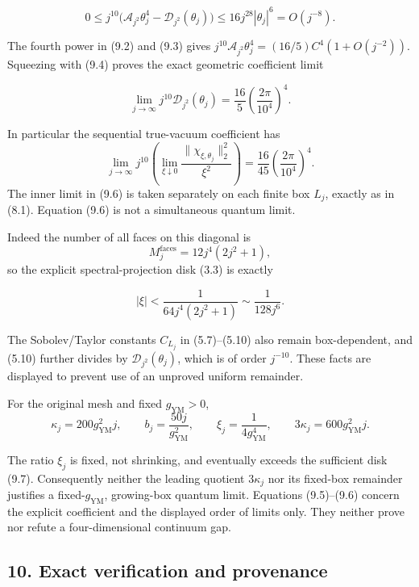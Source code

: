 \documentclass[
  11pt,
]{article}
\begin{document}
\[
0\le j^{10}\big(\mathcal A_{j^2}\theta_j^4
-\mathcal D_{j^2}(\theta_j)\big)
\le16j^{28}|\theta_j|^6=O(j^{-8}).
\tag{9.4}
\]

The fourth power in (9.2) and (9.3) gives
\(j^{10}\mathcal A_{j^2}\theta_j^4
=(16/5)C^4(1+O(j^{-2}))\). Squeezing with (9.4) proves the exact
geometric coefficient limit

\[
\boxed{\lim_{j\to\infty}j^{10}\mathcal D_{j^2}(\theta_j)
=\frac{16}{5}\left(\frac{2\pi}{10^4}\right)^4.}
\tag{9.5}
\]

In particular the sequential true-vacuum coefficient has \[
\lim_{j\to\infty}j^{10}
\left(\lim_{\xi\downarrow0}
\frac{\|\chi_{\xi,\theta_j}\|_2^2}{\xi^2}\right)
=\frac{16}{45}\left(\frac{2\pi}{10^4}\right)^4.
\tag{9.6}
\] The inner limit in (9.6) is taken separately on each finite box
\(L_j\), exactly as in (8.1). Equation (9.6) is not a simultaneous
quantum limit.

Indeed the number of all faces on this diagonal is \[
M_j^{\mathrm{faces}}=12j^4(2j^2+1),
\] so the explicit spectral-projection disk (3.3) is exactly

\[
|\xi|<\frac1{64j^4(2j^2+1)}
\sim\frac1{128j^6}.
\tag{9.7}
\]

The Sobolev/Taylor constants \(C_{L_j}\) in (5.7)--(5.10) also remain
box-dependent, and (5.10) further divides by
\(\mathcal D_{j^2}(\theta_j)\), which is of order \(j^{-10}\). These
facts are displayed to prevent use of an unproved uniform remainder.

For the original mesh and fixed \(g_{\mathrm{YM}}>0\), \[
\kappa_j=200g_{\mathrm{YM}}^2j,\qquad
b_j=\frac{50j}{g_{\mathrm{YM}}^2},\qquad
\xi_j=\frac1{4g_{\mathrm{YM}}^4},\qquad
3\kappa_j=600g_{\mathrm{YM}}^2j.
\tag{9.8}
\]

The ratio \(\xi_j\) is fixed, not shrinking, and eventually exceeds the
sufficient disk (9.7). Consequently neither the leading quotient
\(3\kappa_j\) nor its fixed-box remainder justifies a
fixed-\(g_{\mathrm{YM}}\), growing-box quantum limit. Equations
(9.5)--(9.6) concern the explicit coefficient and the displayed order of
limits only. They neither prove nor refute a four-dimensional continuum
gap.

\subsection{10. Exact verification and
provenance}\label{magnetic-part-2-exact-verification-and-provenance}
\end{document}
